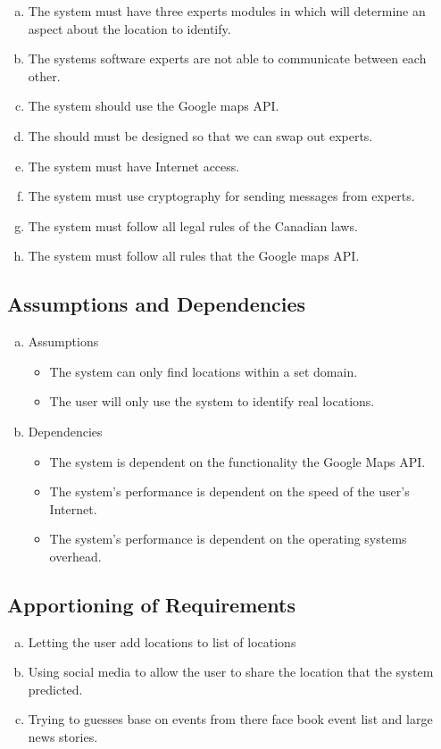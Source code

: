 \documentclass[titlepage]{article}
\begin{document}
\begin{enumerate}[a)]
	\item The system must have three experts modules in which will determine an aspect about the location to identify.
	\item The systems software experts are not able to communicate between each other.
	\item The system should use the Google maps API.
	\item The should must be designed so that we can swap out experts.
	\item The system must have Internet access.
	\item The system must use cryptography for sending messages from experts.
	\item The system must follow all legal rules of the Canadian laws.
	\item The system must follow all rules that the Google maps API.
	
\end{enumerate}

\subsection{Assumptions and Dependencies}
\label{sub:assumptions_and_dependencies}
\begin{enumerate}[a)]
	\item Assumptions
\begin{itemize}
		\item The system can only find locations within a set domain.
		\item The user will only use the system to identify real locations.
		
	\end{itemize}
	\item Dependencies
	
	\begin{itemize}
		\item The system is dependent on the functionality the Google Maps API.
		\item The system's performance is dependent on the speed of the user's Internet.
		\item The system's performance is dependent on the operating systems overhead.
		
	\end{itemize}
\end{enumerate}

\subsection{Apportioning of Requirements}
\label{sub:apportioning_of_requirements}
\begin{enumerate}[a)]
	\item Letting the user add locations to list of locations
	\item Using social media to allow the user to share the location that the system predicted.
	\item Trying to guesses base on events from there face book event list and large news stories.
	
\end{enumerate}
\end{document}
